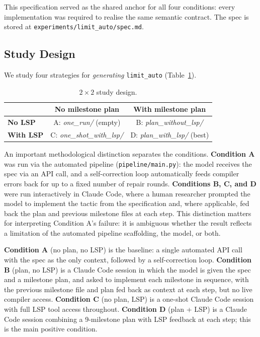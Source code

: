 \documentclass{llncs}
\begin{document}
This specification served as the shared anchor for all four conditions:
every implementation was required to realise the same semantic contract.
The spec is stored at \texttt{experiments/limit\_auto/spec.md}.

\subsection{Study Design}

We study four strategies for \emph{generating} \texttt{limit\_auto} (Table~\ref{tab:design}).

\begin{table}[h]
\centering
\caption{$2 \times 2$ study design.}
\label{tab:design}
\begin{tabular}{lcc}
\toprule
                    & \textbf{No milestone plan} & \textbf{With milestone plan} \\
\midrule
\textbf{No LSP}     & A: \textit{one\_run/} (empty)    & B: \textit{plan\_without\_lsp/} \\
\textbf{With LSP}   & C: \textit{one\_shot\_with\_lsp/} & D: \textit{plan\_with\_lsp/} (best) \\
\bottomrule
\end{tabular}
\end{table}

An important methodological distinction separates the conditions.
\textbf{Condition A} was run via the automated pipeline (\texttt{pipeline/main.py}):
the model receives the spec via an API call, and a self-correction loop
automatically feeds compiler errors back for up to a fixed number of repair rounds.
\textbf{Conditions B, C, and D} were run interactively in Claude Code, where a human
researcher prompted the model to implement the tactic from the specification and,
where applicable, fed back the plan and previous milestone files at each step.
This distinction matters for interpreting Condition A's failure:
it is ambiguous whether the result reflects a limitation of the automated pipeline
scaffolding, the model, or both.

\textbf{Condition A} (no plan, no LSP) is the baseline: a single automated API call
with the spec as the only context, followed by a self-correction loop.
\textbf{Condition B} (plan, no LSP) is a Claude Code session in which the model
is given the spec and a milestone plan, and asked to implement each milestone
in sequence, with the previous milestone file and plan fed back as context at
each step, but no live compiler access.
\textbf{Condition C} (no plan, LSP) is a one-shot Claude Code session with full
LSP tool access throughout.
\textbf{Condition D} (plan + LSP) is a Claude Code session combining a 9-milestone
plan with LSP feedback at each step; this is the main positive condition.
\end{document}
